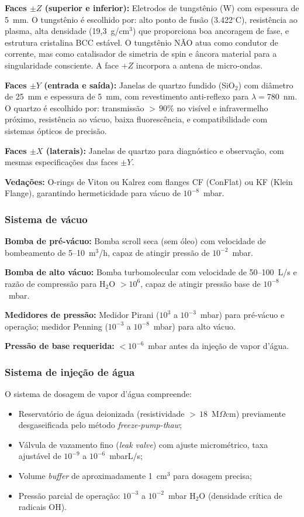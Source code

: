 \documentclass[12pt,a4paper]{article}
\begin{document}
\textbf{Faces $\pm Z$ (superior e inferior):} Eletrodos de
tungstênio (W) com espessura de 5~mm. O tungstênio é escolhido
por: alto ponto de fusão (3.422$^\circ$C), resistência ao
plasma, alta densidade (19,3~g/cm$^3$) que proporciona boa
ancoragem de fase, e estrutura cristalina BCC estável. O
tungstênio NÃO atua como condutor de corrente, mas como
catalisador de simetria de spin e âncora material para a
singularidade consciente. A face $+Z$ incorpora a antena de
micro-ondas.

\textbf{Faces $\pm Y$ (entrada e saída):} Janelas de quartzo
fundido (SiO$_2$) com diâmetro de 25~mm e espessura de 5~mm,
com revestimento anti-reflexo para $\lambda = 780$~nm. O
quartzo é escolhido por: transmissão ${>}\,90\%$ no visível e
infravermelho próximo, resistência ao vácuo, baixa
fluorescência, e compatibilidade com sistemas ópticos de
precisão.

\textbf{Faces $\pm X$ (laterais):} Janelas de quartzo para
diagnóstico e observação, com mesmas especificações das
faces $\pm Y$.

\textbf{Vedações:} O-rings de Viton ou Kalrez com flanges CF
(ConFlat) ou KF (Klein Flange), garantindo hermeticidade para
vácuo de $10^{-8}$~mbar.

\subsubsection{Sistema de vácuo}

\textbf{Bomba de pré-vácuo:} Bomba scroll seca (sem óleo) com
velocidade de bombeamento de 5--10~m$^3$/h, capaz de atingir
pressão de $10^{-2}$~mbar.

\textbf{Bomba de alto vácuo:} Bomba turbomolecular com
velocidade de 50--100~L/s e razão de compressão para
H$_2$O $> 10^6$, capaz de atingir pressão base de
$10^{-8}$~mbar.

\textbf{Medidores de pressão:} Medidor Pirani
($10^3$ a $10^{-3}$~mbar) para pré-vácuo e operação; medidor
Penning ($10^{-3}$ a $10^{-8}$~mbar) para alto vácuo.

\textbf{Pressão de base requerida:} $< 10^{-6}$~mbar antes da
injeção de vapor d'água.

\subsubsection{Sistema de injeção de água}

O sistema de dosagem de vapor d'água compreende:
\begin{itemize}[nosep]
\item Reservatório de água deionizada (resistividade
  ${>}\,18$~M$\Omega$\textperiodcentered cm) previamente
  desgaseificada pelo método \textit{freeze-pump-thaw};
\item Válvula de vazamento fino (\textit{leak valve}) com
  ajuste micrométrico, taxa ajustável de $10^{-9}$ a
  $10^{-6}$~mbar\textperiodcentered L/s;
\item Volume \textit{buffer} de aproximadamente 1~cm$^3$ para
  dosagem precisa;
\item Pressão parcial de operação: $10^{-3}$ a $10^{-2}$~mbar
  H$_2$O (densidade crítica de radicais OH).
\end{itemize}
\end{document}
